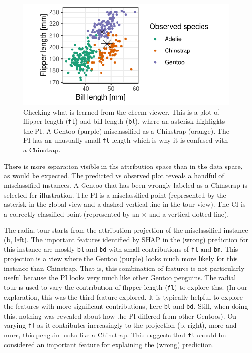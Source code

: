 \documentclass[11pt,twoside]{article}
\begin{document}
\begin{figure}

{\centering \includegraphics[width=1\linewidth]{./figures/case_penguins_BlFl} 

}

\caption{Checking what is learned from the cheem viewer. This is a plot of flipper length (\texttt{fl}) and bill length (\texttt{bl}), where an asterisk highlights the PI. A Gentoo (purple) misclassified as a Chinstrap (orange). The PI has an unusually small \texttt{fl} length which is why it is confused with a Chinstrap.}\label{fig:casepenguinsblfl}
\end{figure}

There is more separation visible in the attribution space than in the data space, as would be expected. The predicted vs observed plot reveals a handful of misclassified instances. A Gentoo that has been wrongly labeled as a Chinstrap is selected for illustration. The PI is a misclassified point (represented by the asterisk in the global view and a dashed vertical line in the tour view). The CI is a correctly classified point (represented by an \(\times\) and a vertical dotted line).

The radial tour starts from the attribution projection of the misclassified instance (b, left). The important features identified by SHAP in the (wrong) prediction for this instance are mostly \texttt{bl} and \texttt{bd} with small contributions of \texttt{fl} and \texttt{bm}. This projection is a view where the Gentoo (purple) looks much more likely for this instance than Chinstrap. That is, this combination of features is not particularly useful because the PI looks very much like other Gentoo penguins. The radial tour is used to vary the contribution of flipper length (\texttt{fl}) to explore this. (In our exploration, this was the third feature explored. It is typically helpful to explore the features with more significant contributions, here \texttt{bl} and \texttt{bd}. Still, when doing this, nothing was revealed about how the PI differed from other Gentoos). On varying \texttt{fl} as it contributes increasingly to the projection (b, right), more and more, this penguin looks like a Chinstrap. This suggests that \texttt{fl} should be considered an important feature for explaining the (wrong) prediction.
\end{document}
